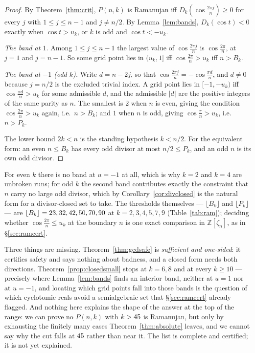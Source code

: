 \begin{proof}
By Theorem~\ref{thm:crit}, $P(n,k)$ is Ramanujan iff $D_k(\cos\frac{2\pi j}{n})\ge0$
for every $j$ with $1\le j\le n-1$ and $j\ne n/2$. By Lemma~\ref{lem:bands},
$D_k(\cos t)<0$ exactly when $\cos t>u_k$, or $k$ is odd and $\cos t<-u_k$.

\emph{The band at $1$.} Among $1\le j\le n-1$ the largest value of
$\cos\frac{2\pi j}{n}$ is $\cos\frac{2\pi}{n}$, at $j=1$ and $j=n-1$. So some
grid point lies in $(u_k,1]$ iff $\cos\frac{2\pi}{n}>u_k$ iff $n>B_k$.

\emph{The band at $-1$ (odd $k$).} Write $d=n-2j$, so that
$\cos\frac{2\pi j}{n}=-\cos\frac{\pi d}{n}$, and $d\ne0$ because $j=n/2$ is the
excluded trivial index. A grid point lies in $[-1,-u_k)$ iff
$\cos\frac{\pi d}{n}>u_k$ for some admissible $d$, and the admissible $|d|$ are
the positive integers of the same parity as $n$. The smallest is $2$ when $n$ is
even, giving the condition $\cos\frac{2\pi}{n}>u_k$ again, i.e.\ $n>B_k$; and
$1$ when $n$ is odd, giving $\cos\frac{\pi}{n}>u_k$, i.e.\ $n>P_k$.

The lower bound $2k<n$ is the standing hypothesis $k<n/2$. For the equivalent
form: an even $n\le B_k$ has every odd divisor at most $n/2\le P_k$, and an odd
$n$ is its own odd divisor.
\end{proof}

For even $k$ there is no band at $u=-1$ at all, which is why $k=2$ and $k=4$
are unbroken runs; for odd $k$ the second band contributes exactly the
constraint that $n$ carry no large odd divisor, which by
Corollary~\ref{cor:divclosed} is the natural form for a divisor-closed set to
take. The thresholds themselves --- $\lfloor B_k\rfloor$ and $\lfloor P_k\rfloor$
--- are $\lfloor B_k\rfloor=23,32,42,50,70,90$
at $k=2,3,4,5,7,9$ (Table~\ref{tab:ram}); deciding whether
$\cos\frac{2\pi}{n}\le u_k$ at the boundary $n$ is one exact comparison in
$\mathbb Z[\zeta_n]$, as in \S\ref{sec:ramcert}.

\begin{remark}
Three things are missing. Theorem~\ref{thm:gcdsafe} is \emph{sufficient and
one-sided}: it certifies safety and says nothing about badness, and a closed
form needs both directions. Theorem~\ref{prop:closedsmall} stops at
$k=6,8$ and at every $k\ge10$ --- precisely where Lemma~\ref{lem:bands} finds an
interior band, neither at $u=1$ nor at $u=-1$, and locating which grid points
fall into those bands is the question of which cyclotomic reals avoid a
semialgebraic set that \S\ref{sec:ramcert} already flagged. And nothing here explains the shape of the
answer at the top of the range: we can prove no $P(n,k)$ with
$k>45$ is Ramanujan, but only by exhausting the finitely many cases
Theorem~\ref{thm:absolute} leaves, and we cannot say why the cut falls at
$45$ rather than near it. The list is complete and certified; it is
not yet explained.
\end{remark}

